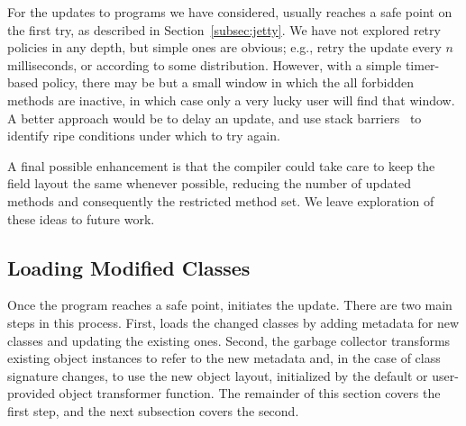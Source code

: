 For the updates to programs we have considered, \DSU{} usually reaches
a safe point on the first try, as described
in Section~\ref{subsec:jetty}.  We have not explored retry
policies in any depth, but simple ones are obvious; e.g., retry the
update every $n$ milliseconds, or according 
to some distribution.  However, with a simple timer-based policy,
there may be but a small 
window in which the all forbidden methods are inactive, in which case
only a very lucky user will find that window.  A better approach would
be to delay an update, and use stack barriers~\cite{CHL:98} to
identify ripe conditions under which to try again.

A final possible enhancement is that the compiler could take care to
keep the field layout the same whenever possible, reducing the number
of updated methods and consequently the restricted method set.  We
leave exploration of these ideas to future work.






\subsection{Loading Modified Classes}

Once the program reaches a safe point, \DSU{} initiates the update.
There are two main steps in this process.  First, \DSU{}
loads the changed classes %
by adding metadata for new classes and updating %
the existing ones.
Second, the garbage
collector transforms existing object instances to refer to the new
metadata and, in the case of class signature changes, to use the new
object layout, initialized by the default or user-provided object
transformer function.  The remainder of this section covers the first
step, and the next subsection covers the second.

